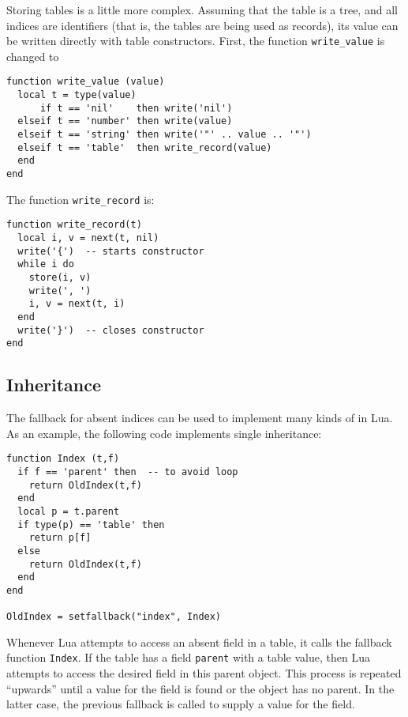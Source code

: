 Storing tables is a little more complex.
Assuming that the table is a tree,
and all indices are identifiers
(that is, the tables are being used as records),
its value can be written directly with table constructors.
First, the function \verb'write_value' is changed to
\begin{verbatim}
function write_value (value)
  local t = type(value)
      if t == 'nil'    then write('nil')
  elseif t == 'number' then write(value)
  elseif t == 'string' then write('"' .. value .. '"')
  elseif t == 'table'  then write_record(value)
  end
end
\end{verbatim}
The function \verb'write_record' is:
\begin{verbatim}
function write_record(t)
  local i, v = next(t, nil)
  write('{')  -- starts constructor
  while i do
    store(i, v)
    write(', ')
    i, v = next(t, i)
  end
  write('}')  -- closes constructor
end
\end{verbatim}


\subsection{Inheritance} \label{exfallback}
The fallback for absent indices can be used to implement many
kinds of  in Lua.
As an example,
the following code implements single inheritance:
\begin{verbatim}
function Index (t,f)
  if f == 'parent' then  -- to avoid loop
    return OldIndex(t,f)
  end
  local p = t.parent
  if type(p) == 'table' then
    return p[f]
  else
    return OldIndex(t,f)
  end
end

OldIndex = setfallback("index", Index)
\end{verbatim}
Whenever Lua attempts to access an absent field in a table,
it calls the fallback function \verb'Index'.
If the table has a field \verb'parent' with a table value,
then Lua attempts to access the desired field in this parent object.
This process is repeated ``upwards'' until a value
for the field is found or the object has no parent.
In the latter case, the previous fallback is called to supply a value
for the field.

